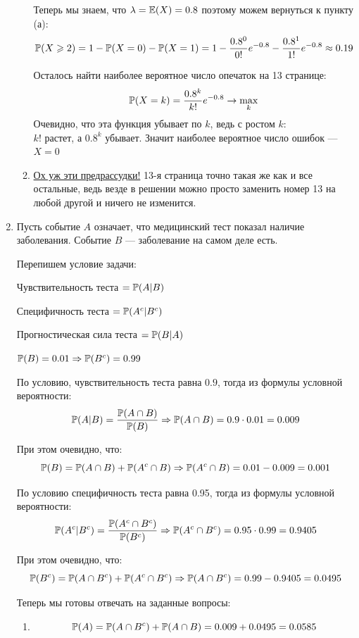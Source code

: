 \begin{enumerate}
\begin{enumerate}
Теперь мы знаем, что $\lambda = \E(X) = 0.8$ поэтому можем вернуться к пункту (а):
\[
\P(X \geqslant 2) = 1 - \P(X=0) - \P(X=1)  = 1 - \frac{0.8^0}{0!}e^{-0.8} - \frac{0.8^1}{1!}e^{-0.8} \approx 0.19
\]

Осталось найти наиболее вероятное число опечаток на 13 странице:
\[
\P(X=k) = \frac{0.8^k}{k!}e^{-0.8} \rightarrow \max \limits_k
\]
Очевидно, что эта функция убывает по $k$, ведь с ростом $k$:\\
 $k!$ растет, а $0.8^k$ убывает. Значит наиболее вероятное число ошибок — $X = 0$

\item \href{https://en.wikipedia.org/wiki/Triskaidekaphobia}{Ох уж эти предрассудки!}
13-я страница точно такая же как и все остальные, ведь везде в решении можно просто заменить номер 13 на любой другой и ничего не изменится.

\end{enumerate}

\item
Пусть событие $A$ означает, что медицинский тест показал наличие заболевания.
Событие $B$ — заболевание на самом деле есть.

Перепишем условие задачи:

Чувствительность теста $=\P(A |B)$

Специфичность теста $=\P(A^c | B^c)$

Прогностическая сила теста $=\P(B | A)$

$\P(B) = 0.01 \Rightarrow \P(B^c) = 0.99 $

По условию, чувствительность теста равна $0.9$, тогда из формулы условной вероятности:
\[
\P(A | B) = \frac{\P(A \cap B)}{\P(B)} \Rightarrow
\P(A \cap B) = 0.9 \cdot 0.01 = 0.009
\]

При этом очевидно, что:
\[
\P(B) = \P(A \cap B) +  \P(A^c \cap B) \Rightarrow
\P(A^c \cap B) = 0.01 - 0.009 = 0.001
\]

По условию специфичность теста равна 0.95, тогда из формулы условной вероятности:
\[
\P(A^c | B^c) = \frac{\P(A^c \cap B^c)}{\P(B^c)} \Rightarrow
\P(A^c \cap B^c) =0.95 \cdot 0.99 = 0.9405
\]

При этом очевидно, что:
\[
\P(B^c) = \P(A \cap B^c) + \P(A^c \cap B^c) \Rightarrow
\P(A \cap B^c) = 0.99 - 0.9405 = 0.0495
\]

Теперь мы готовы отвечать на заданные вопросы:

\begin{enumerate}
\item
\[
\P(A) = \P(A \cap B^c) + \P(A \cap B) = 0.009+0.0495 = 0.0585
\]


\end{enumerate}
\end{enumerate}
